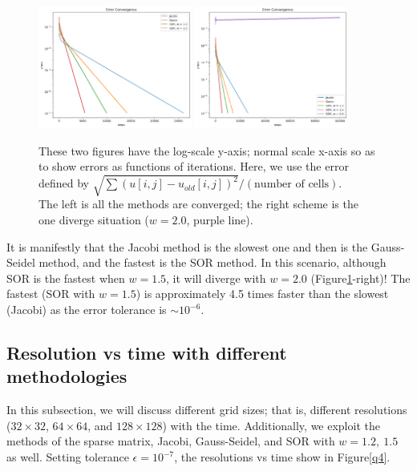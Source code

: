 \documentclass[12pt]{article}
\begin{document}
    \begin{figure}[H]
        \centering
        \includegraphics[width = 0.45\textwidth]{./fig/3.1.png}
        \includegraphics[width = 0.45\textwidth]{./fig/3.2.png}
        \caption{These two figures have the log-scale y-axis; normal scale x-axis so as to show errors as functions of iterations. Here, we use the error defined by $\sqrt{\sum (u[i,j]-u_{old}[i,j])^{2}} / (\text{number of cells})$.\\
        The left is all the methods are converged; the right scheme is the one diverge situation ($w = 2.0$, purple line).}\label{q3}
    \end{figure}

    It is manifestly that the Jacobi method is the slowest one and then is the Gauss-Seidel method, and the fastest is the SOR method. In this scenario, although SOR is the fastest when $w = 1.5$, it will diverge with $w = 2.0$ (Figure\ref{q3}-right)! The fastest (SOR with $w = 1.5$) is approximately 4.5 times faster than the slowest (Jacobi) as the error tolerance is $\sim 10^{-6}$.

    \subsection{Resolution vs time with different methodologies}
    In this subsection, we will discuss different grid sizes; that is, different resolutions ($32 \times 32$, $64 \times 64$, and $128 \times 128$) with the time. Additionally, we exploit the methods of the sparse matrix, Jacobi, Gauss-Seidel, and SOR with $w = 1.2,\ 1.5$ as well. Setting tolerance $\epsilon = 10^{-7}$, the resolutions vs time show in Figure\ref{q4}.
\end{document}
